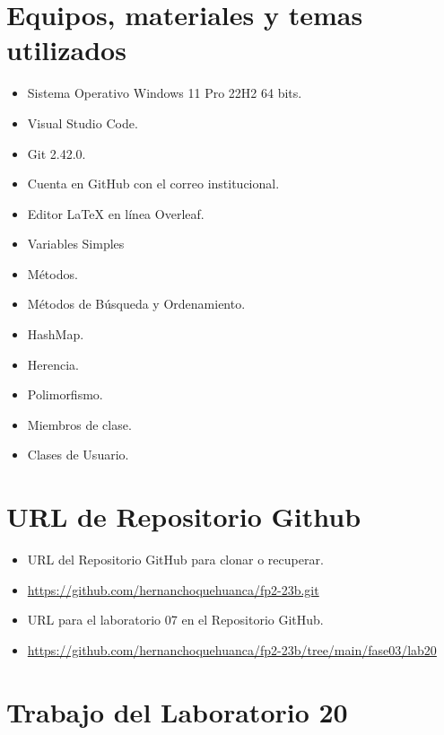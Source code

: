 \documentclass{article}
\newcommand{\itemPracticeNumber}{20}
\begin{document}
\section{Equipos, materiales y temas utilizados}
	\begin{itemize}
		\item Sistema Operativo Windows 11 Pro 22H2 64 bits.
		\item Visual Studio Code.
		\item Git 2.42.0.
		\item Cuenta en GitHub con el correo institucional.
        \item Editor LaTeX en línea Overleaf.
        \item Variables Simples
        \item Métodos.
        \item Métodos de Búsqueda y Ordenamiento.
        \item HashMap.
        \item Herencia.
        \item Polimorfismo.
        \item Miembros de clase.
        \item Clases de Usuario.
        
        
	\end{itemize}
	
\section{URL de Repositorio Github}
	\begin{itemize}
		\item URL del Repositorio GitHub para clonar o recuperar.
        \item \url{https://github.com/hernanchoquehuanca/fp2-23b.git}
		\item URL para el laboratorio 07 en el Repositorio GitHub.
		\item \url{https://github.com/hernanchoquehuanca/fp2-23b/tree/main/fase03/lab20}
	\end{itemize}
	
	\section{Trabajo del Laboratorio \itemPracticeNumber}
        
        
\end{document}
